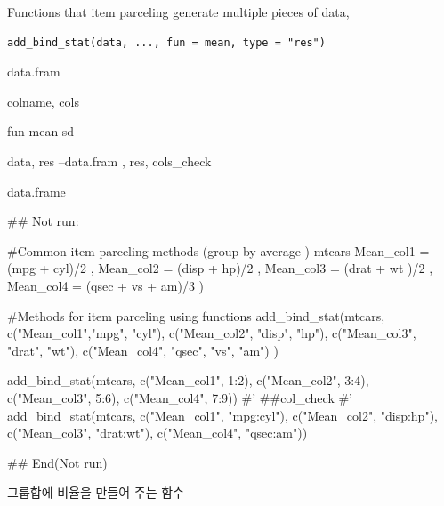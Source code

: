 \documentclass[a4paper]{book}
\begin{document}
%
\begin{Description}
Functions that item parceling generate multiple pieces of data,
\end{Description}
%
\begin{Usage}
\begin{verbatim}
add_bind_stat(data, ..., fun = mean, type = "res")
\end{verbatim}
\end{Usage}
%
\begin{Arguments}
\begin{ldescription}
\item[\code{data}] data.fram

\item[\code{...}] colname, cols

\item[\code{fun}] fun  mean sd

\item[\code{type}] data, res --data.fram , res, cols\_check
\end{ldescription}
\end{Arguments}
%
\begin{Value}
data.frame
\end{Value}
%
\begin{Examples}
\begin{ExampleCode}
\#\# Not run: 

#Common item parceling methods (group by average )
mtcars %
Mean_col1 = (mpg + cyl)/2 ,
Mean_col2 = (disp + hp)/2 ,
Mean_col3 = (drat + wt )/2 ,
Mean_col4 = (qsec + vs + am)/3 )

#Methods for item parceling using functions
add_bind_stat(mtcars,
c("Mean_col1","mpg", "cyl"),
c("Mean_col2", "disp", "hp"),
c("Mean_col3", "drat", "wt"),
c("Mean_col4", "qsec", "vs", "am") )



add_bind_stat(mtcars,
   c("Mean_col1", 1:2),
   c("Mean_col2", 3:4),
   c("Mean_col3", 5:6),
   c("Mean_col4", 7:9))
#'  ##col_check
#'
add_bind_stat(mtcars,
              c("Mean_col1", "mpg:cyl"),
              c("Mean_col2", "disp:hp"),
              c("Mean_col3", "drat:wt"),
              c("Mean_col4", "qsec:am"))

## End(Not run)

\end{ExampleCode}
\end{Examples}
%
\begin{Description}
그룹합에 비율을 만들어 주는 함수
\end{Description}
\end{document}

